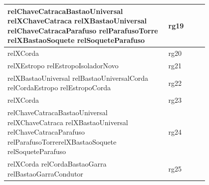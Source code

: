 \documentclass[12pt]{article}
\begin{document}
\begin{table}[H]
\begin{tabular}{|p{0.8\linewidth}|l|}
relChaveCatracaBastaoUniversal relXChaveCatraca relXBastaoUniversal relChaveCatracaParafuso relParafusoTorre relXBastaoSoquete relSoqueteParafuso                                                                                                                                                                                           & rg19        \\ \hline
relXCorda                                                                                                                                                                                                                                                                                                                                 & rg20        \\ \hline
relXEstropo relEstropoIsoladorNovo                                                                                                                                                                                                                                                                                                         & rg21        \\ \hline
relXBastaoUniversal relBastaoUniversalCorda relCordaEstropo relEstropoCorda                                                                                                                                                                                                                                                                & rg22        \\ \hline
relXCorda                                                                                                                                                                                                                                                                                                                                 & rg23        \\ \hline
relChaveCatracaBastaoUniversal relXChaveCatraca relXBastaoUniversal relChaveCatracaParafuso relParafusoTorrerelXBastaoSoquete relSoqueteParafuso                                                                                                                                                                                           & rg24        \\ \hline
relXCorda relCordaBastaoGarra relBastaoGarraCondutor                                                                                                                                                                                                                                                                                      & rg25        \\ \hline

\end{tabular}
\end{table}
\end{document}
